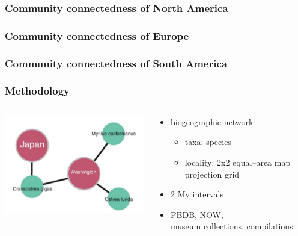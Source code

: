 \documentclass{beamer} \usepackage{amsmath,amsthm}
\begin{document}
\begin{frame}
  \frametitle{Community connectedness of North America}
\end{frame}

\begin{frame}
  \frametitle{Community connectedness of Europe}
\end{frame}

\begin{frame}
  \frametitle{Community connectedness of South America}
\end{frame}

\begin{frame}
  \frametitle{Methodology}
  \begin{columns}
    \begin{column}{0.5\textwidth}
      \includegraphics[height = 0.8\textheight, width = \textwidth, keepaspectratio = true]{figure/vilhena}

      \tiny{}
    \end{column}
    \begin{column}{0.5\textwidth}
      \begin{itemize}
        \item biogeographic network
          \begin{itemize}
            \item taxa: species
            \item locality: 2x2 equal--area map projection grid
          \end{itemize}
        \item 2 My intervals
        \item PBDB, NOW, \\museum collections, compilations
      \end{itemize}
    \end{column}
  \end{columns}

\end{frame}
\end{document}
